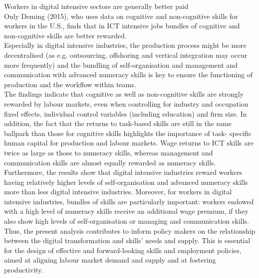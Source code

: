 Workers in digital intensive sectors are generally better paid\\

Only Deming (2015), who uses data on cognitive and non-cognitive skills for workers in the U.S., finds that in ICT intensive jobs bundles of cognitive and non-cognitive skills are better rewarded.\\

Especially in digital intensive industries, the production process might be more decentralised (as e.g. outsourcing, offshoring and vertical integration may occur more frequently) and the bundling of self-organisation and management and communication with advanced numeracy skills is key to ensure the functioning of production and the workflow within teams.\\

The findings indicate that cognitive as well as non-cognitive skills are strongly rewarded by labour markets, even when controlling for industry and occupation fixed effects, individual control variables (including education) and firm size. In addition, the fact that the returns to task-based skills are still in the same ballpark than those for cognitive skills highlights the importance of task- specific human capital for production and labour markets. Wage returns to ICT skills are twice as large as those to numeracy skills, whereas management and communication skills are almost equally rewarded as numeracy skills.\\

Furthermore, the results show that digital intensive industries reward workers having relatively higher levels of self-organisation and advanced numeracy skills more than less digital intensive industries. Moreover, for workers in digital intensive industries, bundles of skills are particularly important: workers endowed with a high level of numeracy skills receive an additional wage premium, if they also show high levels of self-organisation or managing and communication skills. Thus, the present analysis contributes to inform policy makers on the relationship between the digital transformation and skills’ needs and supply. This is essential for the design of effective and forward-looking skills and employment policies, aimed at aligning labour market demand and supply and at fostering productivity.\\

